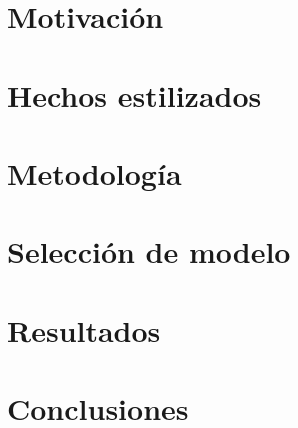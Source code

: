 







\section{Motivación}

\section{Hechos estilizados}

\section{Metodología}

\section{Selección de modelo}

\section{Resultados}
\section{Conclusiones}




